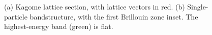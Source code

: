 \vspace{1cm}

\begin{figure}[ht]
    \centering
    \hfill
    \caption{(a) Kagome lattice section, with lattice vectors in red. (b) Single-particle bandstructure, with the first Brillouin zone inset. The highest-energy band (green) is flat.}
    \label{Fig:Lattice_and_Bandstructure}
\end{figure}

\vspace{0.75cm}

